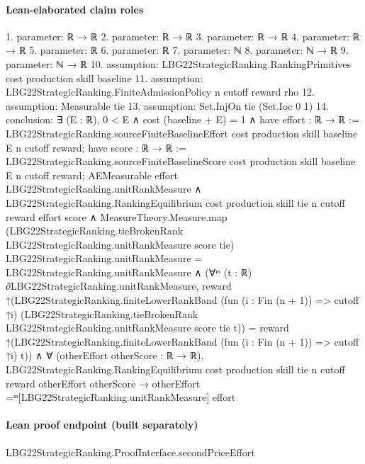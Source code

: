 \documentclass[10pt]{article}
\begin{document}
\paragraph{Lean-elaborated claim roles}\begin{ReviewVerbatim}
1. parameter: ℝ → ℝ
2. parameter: ℝ → ℝ
3. parameter: ℝ → ℝ
4. parameter: ℝ → ℝ
5. parameter: ℝ
6. parameter: ℝ
7. parameter: ℕ
8. parameter: ℕ → ℝ
9. parameter: ℕ → ℝ
10. assumption: LBG22StrategicRanking.RankingPrimitives cost production skill baseline
11. assumption: LBG22StrategicRanking.FiniteAdmissionPolicy n cutoff reward rho
12. assumption: Measurable tie
13. assumption: Set.InjOn tie (Set.Ioc 0 1)
14. conclusion: ∃ (E : ℝ),
  0 < E ∧
    cost (baseline + E) = 1 ∧
      have effort : ℝ → ℝ :=
        LBG22StrategicRanking.sourceFiniteBaselineEffort cost production skill baseline E n cutoff reward;
      have score : ℝ → ℝ :=
        LBG22StrategicRanking.sourceFiniteBaselineScore cost production skill baseline E n cutoff reward;
      AEMeasurable effort LBG22StrategicRanking.unitRankMeasure ∧
        LBG22StrategicRanking.RankingEquilibrium cost production skill tie n cutoff reward effort score ∧
          MeasureTheory.Measure.map
                (LBG22StrategicRanking.tieBrokenRank LBG22StrategicRanking.unitRankMeasure score tie)
                LBG22StrategicRanking.unitRankMeasure =
              LBG22StrategicRanking.unitRankMeasure ∧
            (∀ᵐ (t : ℝ) ∂LBG22StrategicRanking.unitRankMeasure,
                reward
                    ↑(LBG22StrategicRanking.finiteLowerRankBand (fun (i : Fin (n + 1)) => cutoff ↑i)
                        (LBG22StrategicRanking.tieBrokenRank LBG22StrategicRanking.unitRankMeasure score tie t)) =
                  reward ↑(LBG22StrategicRanking.finiteLowerRankBand (fun (i : Fin (n + 1)) => cutoff ↑i) t)) ∧
              ∀ (otherEffort otherScore : ℝ → ℝ),
                LBG22StrategicRanking.RankingEquilibrium cost production skill tie n cutoff reward otherEffort
                    otherScore →
                  otherEffort =ᵐ[LBG22StrategicRanking.unitRankMeasure] effort
\end{ReviewVerbatim}

\paragraph{Lean proof endpoint (built separately)}\begin{ReviewVerbatim}
LBG22StrategicRanking.ProofInterface.secondPriceEffort
\end{ReviewVerbatim}
\end{document}

